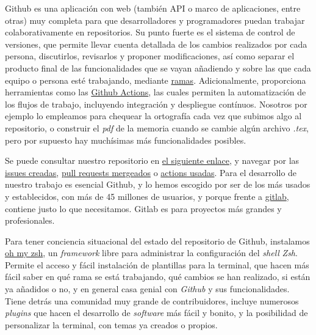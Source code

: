Github es una aplicación con web (también API o marco de aplicaciones, entre otras) muy completa 
para que desarrolladores y programadores puedan trabajar colaborativamente 
en repositorios. Su punto fuerte es el sistema de control de versiones, que permite llevar 
cuenta detallada de los cambios realizados por cada persona, discutirlos, revisarlos y proponer 
modificaciones, así como 
separar el producto final de las funcionalidades que se vayan añadiendo y sobre las que cada equipo o persona 
esté trabajando, mediante \href{https://docs.github.com/pull-requests/collaborating-with-pull-requests/proposing-changes-to-your-work-with-pull-requests/about-branches}{ramas}. 
Adicionalmente, proporciona herramientas como las \href{https://github.com/features/actions}{Github Actions}, 
las cuales permiten la automatización de los flujos de trabajo, incluyendo integración y despliegue contínuos.
Nosotros por ejemplo lo empleamos para chequear la ortografía cada vez que subimos algo al repositorio, o construir el \textit{pdf}
de la memoria cuando se cambie algún archivo \textit{.tex}, pero por supuesto hay muchísimas más funcionalidades posibles.

Se puede consultar nuestro repositorio en \href{https://github.com/ElenaMerelo/TFG}{el siguiente enlace}, y navegar 
por las \href{https://github.com/ElenaMerelo/TFG/issues}{issues creadas}, \href{https://github.com/ElenaMerelo/TFG/pulls}{pull requests mergeados} 
o \href{https://github.com/ElenaMerelo/TFG/actions}{actions usadas}. Para el desarrollo de nuestro trabajo es esencial 
Github, y lo hemos escogido por ser de los más usados y establecidos, con más de 45 millones de usuarios, 
y porque frente a \href{https://about.gitlab.com/}{gitlab}, contiene justo lo que necesitamos. Gitlab es para proyectos 
más grandes y profesionales.

Para tener conciencia situacional del estado del repositorio de Github, instalamos \href{https://ohmyz.sh/}{oh my zsh}, 
un \textit{framework} libre para administrar la configuración del \textit{shell} \textit{Zsh}. Permite el 
acceso y fácil instalación de plantillas para la terminal, que hacen más fácil saber en qué rama se está 
trabajando, qué cambios se han realizado, si están ya añadidos o no, y en general casa genial con 
\textit{Github} y sus funcionalidades. Tiene detrás una comunidad muy grande de 
contribuidores, incluye numerosos \textit{plugins} que hacen el desarrollo de \textit{software} más fácil y bonito, 
y la posibilidad de personalizar la terminal, con temas ya creados o propios.

